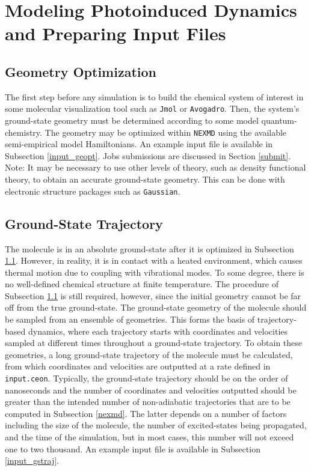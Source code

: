 \documentclass[letterpaper,12pt,titlepage]{article}
\begin{document}
\newpage
\section{Modeling Photoinduced Dynamics and Preparing Input Files}
\label{prepinputs}

\subsection{Geometry Optimization}
\label{geopt}
The first step before any simulation is to build the chemical system of interest in some molecular visualization tool such as \verb+Jmol+ or \verb+Avogadro+.  Then, the system's ground-state geometry must be determined according to some model quantum-chemistry.  The geometry may be optimized within \verb+NEXMD+ using the available semi-empirical model Hamiltonians.  An example input file is available in Subsection \ref{input_geopt}.  Jobs submissions are discussed in Section \ref{submit}.  Note: It may be necessary to use other levels of theory, such as density functional theory, to obtain an accurate ground-state geometry.  This can be done with electronic structure packages such as \verb+Gaussian+.

\subsection{Ground-State Trajectory}
\label{gstraj}
The molecule is in an absolute ground-state after it is optimized in Subsection \ref{geopt}.  However, in reality, it is in contact with a heated environment, which causes thermal motion due to coupling with vibrational modes.  To some degree, there is no well-defined chemical structure at finite temperature.  The procedure of Subsection \ref{geopt} is still required, however, since the initial geometry cannot be far off from the true ground-state.  The ground-state geometry of the molecule should be sampled from an ensemble of geometries.  This forms the basis of trajectory-based dynamics, where each trajectory starts with coordinates and velocities sampled at different times throughout a ground-state trajectory.  To obtain these geometries, a long ground-state trajectory of the molecule must be calculated, from which coordinates and velocities are outputted at a rate defined in \verb+input.ceon+.  Typically, the ground-state trajectory should be on the order of nanoseconds and the number of coordinates and velocities outputted should be greater than the intended number of non-adiabatic trajectories that are to be computed in Subsection \ref{nexmd}.  The latter depends on a number of factors including the size of the molecule, the number of excited-states being propagated, and the time of the simulation, but in most cases, this number will not exceed one to two thousand.  An example input file is available in Subsection \ref{input_gstraj}.
\end{document}
